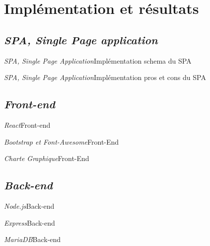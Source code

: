 \documentclass[usenames,dvipsnames]{beamer}
\begin{document}
\section{Implémentation et résultats}
\subsection{\protect\textit{SPA, Single Page application}}
\begin{frame}{\textit{SPA, Single Page Application}}{Implémentation}
    schema du SPA 
\end{frame}

\begin{frame}{\textit{SPA, Single Page Application}}{Implémentation}
    pros et cons du SPA 
\end{frame}


\subsection{\protect\textit{Front-end}}
\begin{frame}{\textit{React}}{Front-end}
    
\end{frame}

\begin{frame}{\textit{Bootstrap et Font-Awesome}}{Front-End}
     
\end{frame}

\begin{frame}{\textit{Charte Graphique}}{Front-End}
     
\end{frame}

\subsection{\protect\textit{Back-end}}
\begin{frame}{\textit{Node.js}}{Back-end}
     
\end{frame}

\begin{frame}{\textit{Express}}{Back-end}
     
\end{frame}

\begin{frame}{\textit{MariaDB}}{Back-end}
     
\end{frame}
\end{document}
